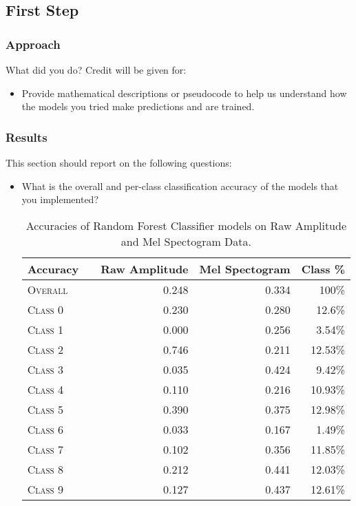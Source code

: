\documentclass[11pt]{article}
\begin{document}
\subsection{First Step}

\subsubsection{Approach}

What did you do? Credit will be given for:

  \begin{itemize}
  \item Provide mathematical descriptions or pseudocode to help us understand how the models you tried make predictions and are trained.
  \end{itemize}

\subsubsection{Results}
This section should report on the following questions: 

\begin{itemize}
\item  What is the overall and per-class classification accuracy of the models that you implemented?
    \begin{table}[ht]
    \centering
    \begin{tabular}{llrrr}
        \toprule
        Accuracy &  & Raw Amplitude & Mel Spectogram & Class \% \\
        \midrule
        \textsc{Overall} & & 0.248 & 0.334 & 100\% \\
        \textsc{Class 0} & & 0.230 & 0.280 & 12.6\% \\
        \textsc{Class 1} & & 0.000 & 0.256 & 3.54\% \\
        \textsc{Class 2} & & 0.746 & 0.211 & 12.53\% \\
        \textsc{Class 3} & & 0.035 & 0.424 & 9.42\% \\
        \textsc{Class 4} & & 0.110 & 0.216 & 10.93\% \\
        \textsc{Class 5} & & 0.390 & 0.375 & 12.98\% \\
        \textsc{Class 6} & & 0.033 & 0.167 & 1.49\% \\
        \textsc{Class 7} & & 0.102 & 0.356 & 11.85\% \\
        \textsc{Class 8} & & 0.212 & 0.441 & 12.03\% \\
        \textsc{Class 9} & & 0.127 & 0.437 & 12.61\% \\
        \bottomrule
    \end{tabular}
    \caption{\label{tab:lr_results} Accuracies of Random Forest Classifier models on Raw Amplitude and Mel Spectogram Data.}
    \end{table}
\end{itemize}
\end{document}
